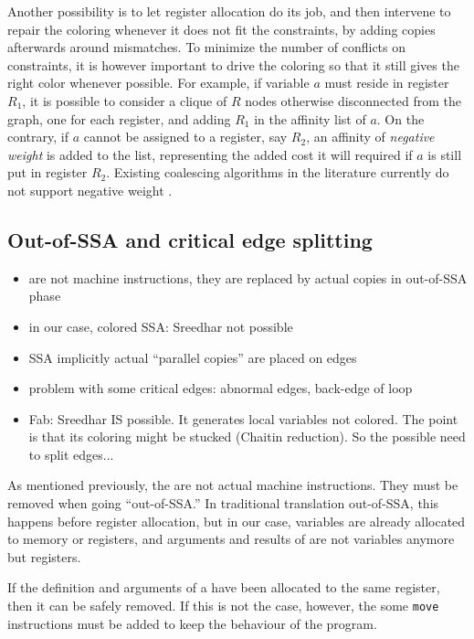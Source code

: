 {Another possibility is to let register allocation do its job, and then 
intervene to repair the coloring whenever it does not fit the constraints, by 
adding copies afterwards around mismatches. To minimize the number of conflicts 
on constraints, it is however important to drive the coloring so that it still 
gives the right color whenever possible. For example, if variable $a$ must 
reside in register $R_1$, it is possible to consider a clique of $R$ nodes 
otherwise disconnected from the graph, one for each register, and adding $R_1$ 
in the affinity list of $a$. On the contrary, if $a$ cannot be assigned to a 
register, say $R_2$, an affinity of \emph{negative weight} is added to the 
list, representing the added cost it will required if $a$ is still put in 
register $R_2$. Existing coalescing algorithms in the literature currently do 
not support negative weight .








\subsection{Out-of-SSA and critical edge splitting}

{\sl
\begin{itemize}
  \item \phifuns are not machine instructions, they are replaced by actual 
    copies in out-of-SSA phase
  \item in our case, colored SSA: Sreedhar not possible
  \item SSA implicitly 
    actual ``parallel copies'' are placed on edges
  \item problem with some critical edges: abnormal edges, back-edge of loop
  \item Fab: Sreedhar IS possible. It generates local variables not colored.
The point is that its coloring might be stucked (Chaitin reduction). So the possible need to split edges...
\end{itemize}
}

As mentioned previously, the \phifuns are not actual machine instructions.  
They must be removed when going ``out-of-SSA.'' In traditional translation 
out-of-SSA, this happens before register allocation, but in our case, variables 
are already allocated to memory or registers, and arguments and results of 
\phifuns are not variables anymore but registers.


If the definition and arguments 
of a \phifun have been allocated to the same register, then it can be safely 
removed. If this is not the case, however, the some {\tt move} instructions 
must be added to keep the behaviour of the program. 



}
